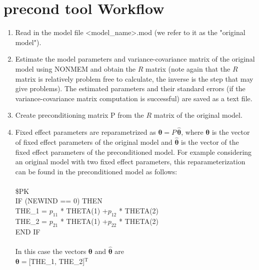 \section{precond tool Workflow}
\begin{enumerate}
    \item Read in the model file <model\_name>.mod (we refer to it as the "original model").
    \item Estimate the model parameters and variance-covariance matrix of the original model using NONMEM and obtain the $R$ matrix (note again that the $R$ matrix is relatively problem free to calculate, the inverse is the step that may give problems).  The estimated parameters and their standard errors (if the variance-covariance matrix computation is successful) are saved as a text file.
    \item Create preconditioning matrix P from the $R$ matrix of the original model.
    \item Fixed effect parameters are reparametrized as $\boldsymbol{\theta} = P \,\hat{\boldsymbol{\theta}}$, where $\boldsymbol{\theta}$ is the vector of fixed effect parameters of the original model and $\hat{\boldsymbol{\theta}}$ is the vector of the fixed effect parameters of the preconditioned model.
     For example considering an original model with two fixed effect parameters, this reparameterization can be found in the preconditioned model as follows:\\
\\
        \$PK\\
        IF (NEWIND == 0) THEN\\
        THE\_1 = $p_{11}$ * THETA(1) +$p_{12}$ * THETA(2)\\
        THE\_2 = $p_{21}$ * THETA(1) +$p_{22}$ * THETA(2)\\
        END IF\\
        \\
              In this case the vectors  ${\boldsymbol{\theta}}$ and $\hat{\boldsymbol{\theta}}$ are\\
        \indent $\boldsymbol{\theta}=$[THE\_1, THE\_2]$^\textrm{T}$\\

\end{enumerate}
